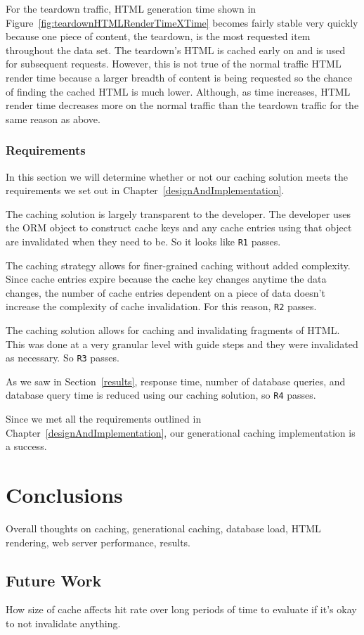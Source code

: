\documentclass[12pt]{ucthesis}
\begin{document}
For the teardown traffic, HTML generation time shown in Figure~\ref{fig:teardownHTMLRenderTimeXTime} becomes fairly stable very quickly because one piece of content, the teardown, is the most requested item throughout the data set.
The teardown's HTML is cached early on and is used for subsequent requests.
However, this is not true of the normal traffic HTML render time because a larger breadth of content is being requested so the chance of finding the cached HTML is much lower.
Although, as time increases, HTML render time decreases more on the normal traffic than the teardown traffic for the same reason as above.

\subsection{Requirements}
In this section we will determine whether or not our caching solution meets the requirements we set out in Chapter~\ref{designAndImplementation}.

The caching solution is largely transparent to the developer.
The developer uses the ORM object to construct cache keys and any cache entries using that object are invalidated when they need to be.
So it looks like {\tt R1} passes.

The caching strategy allows for finer-grained caching without added complexity.
Since cache entries expire because the cache key changes anytime the data changes, the number of cache entries dependent on a piece of data doesn't increase the complexity of cache invalidation.
For this reason, {\tt R2} passes.

The caching solution allows for caching and invalidating fragments of HTML.
This was done at a very granular level with guide steps and they were invalidated as necessary.
So {\tt R3} passes.

As we saw in Section~\ref{results}, response time, number of database queries, and database query time is reduced using our caching solution, so {\tt R4} passes.

Since we met all the requirements outlined in Chapter~\ref{designAndImplementation}, our generational caching implementation is a success.


\chapter{Conclusions} \label{conclusions}
Overall thoughts on caching, generational caching, database load, HTML rendering, web server performance, results.

\section{Future Work}
How size of cache affects hit rate over long periods of time to evaluate if it's okay to not invalidate anything.



\clearpage


\end{document}
